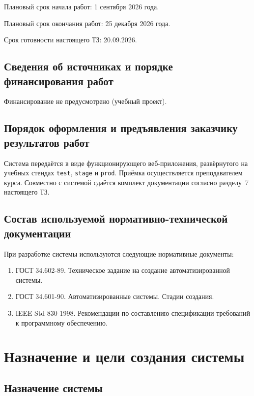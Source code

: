 \documentclass[14pt, a4paper]{extarticle}
\newcommand{\deadline}{20.09.2026}
\begin{document}
Плановый срок начала работ: 1 сентября 2026 года.

Плановый срок окончания работ: 25 декабря 2026 года.

Срок готовности настоящего ТЗ: \deadline.

\subsection{Сведения об источниках и порядке финансирования работ}

Финансирование не предусмотрено (учебный проект).

\subsection{Порядок оформления и предъявления заказчику результатов работ}

Система передаётся в виде функционирующего веб-приложения, развёрнутого на учебных стендах \texttt{test}, \texttt{stage} и \texttt{prod}. Приёмка осуществляется преподавателем курса. Совместно с системой сдаётся комплект документации согласно разделу~7 настоящего ТЗ.

\subsection{Состав используемой нормативно-технической документации}

При разработке системы используются следующие нормативные документы:

\begin{enumerate}
	\item ГОСТ 34.602-89. Техническое задание на создание автоматизированной системы.
	\item ГОСТ 34.601-90. Автоматизированные системы. Стадии создания.
	\item IEEE Std 830-1998. Рекомендации по составлению спецификации требований к программному обеспечению.
\end{enumerate}

\section{Назначение и цели создания системы}

\subsection{Назначение системы}
\end{document}
